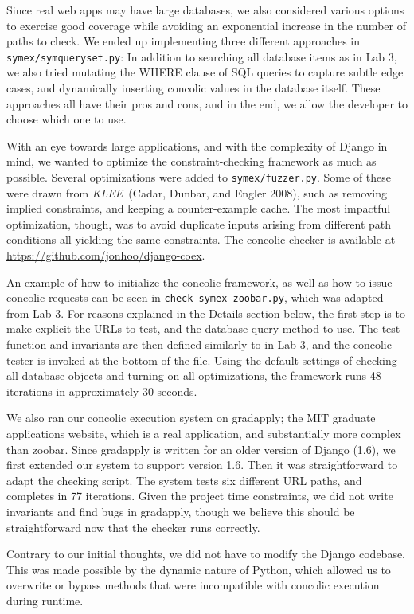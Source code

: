 \documentclass{article}
\begin{document}
Since real web apps may have large databases, we also considered various
options to exercise good coverage while avoiding an exponential increase in the
number of paths to check. We ended up implementing three different approaches
in \texttt{symex/symqueryset.py}: In addition to searching all database items as
in Lab 3, we also tried mutating the WHERE clause of SQL queries to
capture subtle edge cases, and dynamically inserting concolic values
in the database itself. These approaches all have their pros and cons,
and in the end, we allow the developer to choose which one to use.

With an eye towards large applications, and with the complexity of Django in mind,
we wanted to optimize the constraint-checking framework as much
as possible. Several optimizations were added to \texttt{symex/fuzzer.py}. Some
of these were drawn from \textit{KLEE}~(Cadar, Dunbar, and Engler 2008), such
as removing implied constraints, and keeping a counter-example cache.
The most impactful optimization, though, was to avoid duplicate inputs
arising from different path conditions all yielding the same constraints.
The concolic checker is available at \url{https://github.com/jonhoo/django-coex}.

An example of how to initialize the concolic framework, as well as how to issue
concolic requests can be seen in \texttt{check-symex-zoobar.py}, which was
adapted from Lab 3. For reasons explained in the Details section below, the
first step is to make explicit the URLs to test, and the database query method
to use. The test function and invariants are then defined similarly to in Lab
3, and the concolic tester is invoked at the bottom of the file. Using the
default settings of checking all database objects and turning on all
optimizations, the framework runs 48 iterations in approximately 30 seconds.

We also ran our concolic execution system on gradapply; the MIT graduate
applications website, which is a real application, and substantially more
complex than zoobar. Since gradapply is
written for an older version of Django (1.6), we first extended our
system to support version 1.6. Then it was straightforward to adapt
the checking script. The system tests six different URL paths, and
completes in 77 iterations. Given the project time constraints, we did not
write invariants and find bugs in gradapply, though we believe this should be
straightforward now that the checker runs correctly.

Contrary to our initial thoughts, we did not have to modify the
Django codebase. This was made possible by the dynamic nature of
Python, which allowed us to overwrite or bypass methods that were
incompatible with concolic execution during runtime.
\end{document}

